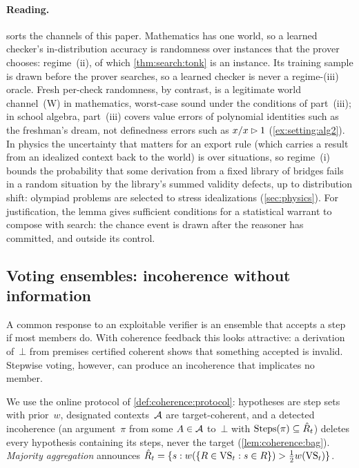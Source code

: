 \paragraph{Reading.}
 sorts the channels of this paper. Mathematics has one world, so a learned checker's in-distribution accuracy is randomness over instances that the prover chooses: regime~(ii), of which \cref{thm:search:tonk} is an instance. Its training sample is drawn before the prover searches, so a learned checker is never a regime-(iii) oracle. Fresh per-check randomness, by contrast, is a legitimate world channel~(W) in mathematics, worst-case sound under the conditions of part~(iii); in school algebra, part~(iii) covers value errors of polynomial identities such as the freshman's dream, not definedness errors such as $x/x\rhd1$ (\cref{ex:setting:alg2}). In physics the uncertainty that matters for an export rule (which carries a result from an idealized context back to the world) is over situations, so regime~(i) bounds the probability that some derivation from a fixed library of bridges fails in a random situation by the library's summed validity defects, up to distribution shift: olympiad problems are selected to stress idealizations (\cref{sec:physics}). For justification, the lemma gives sufficient conditions for a statistical warrant to compose with search: the chance event is drawn after the reasoner has committed, and outside its control.

\subsection{Voting ensembles: incoherence without information}\label{sec:search:ensembles}

A common response to an exploitable verifier is an ensemble that accepts a step if most members do. With coherence feedback this looks attractive: a derivation of~$\bot$ from premises certified coherent shows that something accepted is invalid. Stepwise voting, however, can produce an incoherence that implicates no member.

We use the online protocol of \cref{def:coherence:protocol}: hypotheses are step sets with prior~$w$, designated contexts~$\mathcal{A}$ are target-coherent, and a detected incoherence (an argument~$\pi$ from some $A\in\mathcal{A}$ to~$\bot$ with $\mathrm{Steps}(\pi)\subseteq\hat R_t$) deletes every hypothesis containing its steps, never the target (\cref{lem:coherence:bag}). \emph{Majority aggregation} announces $\hat R_t=\{s: w(\{R\in\mathrm{VS}_t:s\in R\})>\tfrac12 w(\mathrm{VS}_t)\}$.

